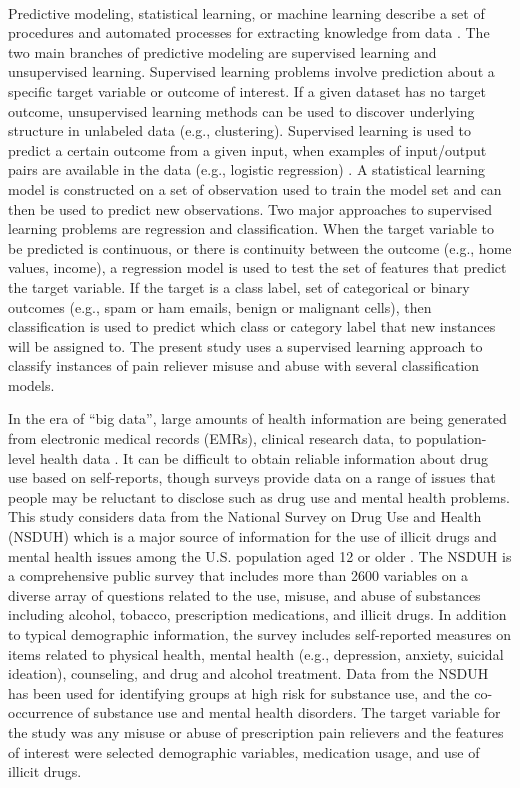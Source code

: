 \\\documentclass[sigconf]{acmart}
\begin{document}
Predictive modeling, statistical learning, or machine learning describe a 
set of procedures and automated processes for extracting knowledge from data 
\cite{james13, kuhn13, muller17, raschka17}. The two main branches of 
predictive modeling are supervised learning and unsupervised learning. 
Supervised learning problems involve prediction about a specific target 
variable or outcome of interest. If a given dataset has no target outcome, 
unsupervised learning methods can be used to discover underlying structure 
in unlabeled data (e.g., clustering). Supervised learning is used to 
predict a certain outcome from a given input, when examples of input/output 
pairs are available in the data (e.g., logistic regression) \cite{muller17}. 
A statistical learning model is constructed on a set of observation used to
train the model set and can then be used to predict new observations. Two major 
approaches to supervised learning problems are regression and classification. 
When the target variable to be predicted is continuous, or there is continuity 
between the outcome (e.g., home values, income), a regression model is used 
to test the set of features that predict the target variable. If the target is 
a class label, set of categorical or binary outcomes (e.g., spam or ham emails, 
benign or malignant cells), then classification is used to predict which class 
or category label that new instances will be assigned to. The present study 
uses a supervised learning approach to classify instances of pain reliever 
misuse and abuse with several classification models. 


In the era of ``big data'', large amounts of health information are being 
generated from electronic medical records (EMRs), clinical research data, to 
population-level health data \cite{herland14}. It can be difficult to obtain 
reliable information about drug use based on self-reports, though surveys 
provide data on a range of issues that people may be reluctant to disclose 
such as drug use and mental health problems. This study considers data from 
the National Survey on Drug Use and Health (NSDUH) which is a major source of 
information for the use of illicit drugs and mental health issues among the 
U.S. population aged 12 or older \cite{samhsa18}. The NSDUH is a comprehensive 
public survey that includes more than 2600 variables on a diverse array of 
questions related to the use, misuse, and abuse of substances including 
alcohol, tobacco, prescription medications, and illicit drugs. In addition 
to typical demographic information, the survey includes self-reported 
measures on items related to physical health, mental health (e.g., depression, 
anxiety, suicidal ideation), counseling, and drug and alcohol treatment. 
Data from the NSDUH has been used for identifying groups at high risk for 
substance use, and the co-occurrence of substance use and mental health 
disorders. The target variable for the study was any misuse or abuse of 
prescription pain relievers and the features of interest were selected 
demographic variables, medication usage, and use of illicit drugs. 
\end{document}
